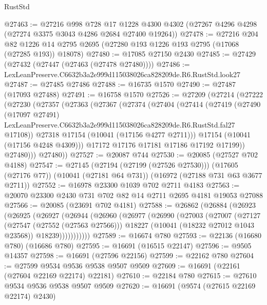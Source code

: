 \begin{lexlean}{RustStd}
\begin{coremodule}
@27463 := @27216
    @998
    @728
    @17
    @1228
    @4300
    @4302
    (@27267 @4296 @4298 (@27274 @3375 @3043 @4286 @2684 @27400 @19264))
@27478 := @27216
    @204
    @82
    @1226
    @14
    @2795
    @2695
    (@27280 @193 @1226 @193 @2795 (@17068 (@27285 @193)) @18078)
@27480 := @17085 @27150 @2430
@27485 := @27429 (@27432 (@27447 (@27463 (@27478 @27480))))
@27486 := LexLeanPreserve.C6632b3a2e999d115038026ca828209de.R6.RustStd.look27
@27487 := @27485 @27486
@27488 := @16735 @1570
@27490 := @27487 (@17093 @27488)
@27491 := @16758 @1570
@27526 := @27209
    (@27214
      (@27222
        (@27230
          (@27357
            (@27363
              (@27367
                (@27374
                  (@27404
                    (@27414
                      (@27419
                        (@27490
                          (@17097 @27491)
                          LexLeanPreserve.C6632b3a2e999d115038026ca828209de.R6.RustStd.fal27
                          @17108))
                      @27318
                      @17154
                      (@10041 (@17156 @4277 @2711)))
                    @17154
                    (@10041 (@17156 @4248 @4309)))
                  @17172
                  @17176
                  @17181
                  @17186
                  @17192
                  @17199))
              @27480)))
        @27480))
@27527 := @20087 @744
@27530 := @20085 (@27527 @702 @4188)
@27547 := @27145
    (@27194 (@27199 (@27526 @27530)))
    (@17605 (@27176 @77))
    (@10041 (@27181 @64 @731))
    (@16972 (@27188 @731 @63 @3677 @2711))
@27552 := @16978 @23300 @1039 @702 @2711 @4183
@27563 := @20070 @23300 @2430 @731 @702 @82 @14 @2711 @2695 @4181 @19053 @27088
@27566 := @20085 (@23691 @702 @4181)
@27588 := @26862
    (@26884
      (@26923
        (@26925
          (@26927
            (@26944
              (@26960
                (@26977
                  (@26990
                    (@27003
                      (@27007
                        (@27127
                          (@27547 (@27552 (@27563 @27566)))
                          @18227
                          (@10041 (@18232 @27012 @1043 @23568))
                          @18239)))))))))))
@27589 := @16674 @780
@27593 := @22136 (@16680 @780) (@16686 @780)
@27595 := @16691 (@16515 @22147)
@27596 := @9505 @14357
@27598 := @16691 (@27596 @22156)
@27599 := @22162 @780
@27604 := @27599 @9534 @9536 @9538 @9507 @9509
@27609 := @16691 (@22161 (@27604 @22169 @22174) @22181)
@27610 := @22184 @780
@27615 := @27610 @9534 @9536 @9538 @9507 @9509
@27620 := @16691 (@9574 (@27615 @22169 @22174) @2430)

\end{coremodule}
\end{lexlean}
